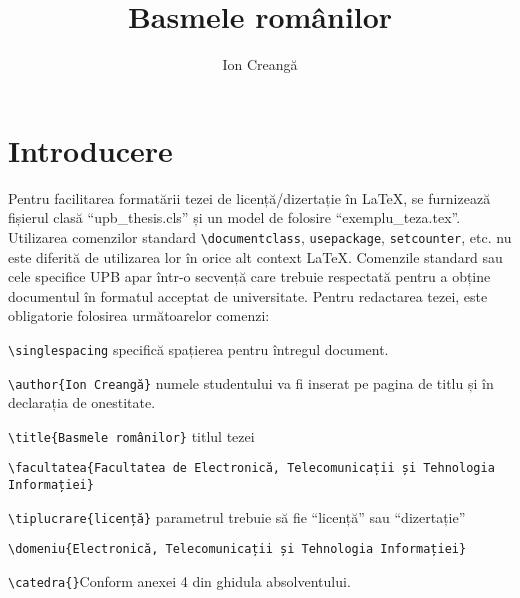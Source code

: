 \documentclass[12pt, a4paper, oneside, romanian]{teza-upb}
\begin{document}
\author{Ion Creangă}

\title{Basmele românilor}




\beforepreface
\listoffigures
\listoftables
{}
\afterpreface 

\chapter{Introducere}


   Pentru facilitarea formatării tezei de licență/dizertație în
   \LaTeX{}, se furnizează fișierul clasă ``upb\_thesis.cls'' și un model de
   folosire ``exemplu\_teza.tex''.  Utilizarea comenzilor standard
   \verb=\documentclass=, \verb=usepackage=, \verb=setcounter=,
   etc. nu este diferită de utilizarea lor în orice alt context
   \LaTeX{}. Comenzile standard sau cele specifice {UPB}
   apar într-o secvență care trebuie respectată pentru a obține documentul în formatul
   acceptat de universitate.  Pentru redactarea tezei, este
   obligatorie folosirea următoarelor comenzi:

\verb=\singlespacing= specifică spațierea pentru întregul document.

\verb=\author{Ion Creangă}= numele studentului va fi inserat pe pagina de titlu și în declarația de onestitate.  

\verb=\title{Basmele românilor}= titlul tezei 

\verb=\facultatea{Facultatea de Electronică, Telecomunicații și Tehnologia= \\
\verb=Informației}=

\verb=\tiplucrare{licență}= parametrul trebuie să fie ``licență'' sau ``dizertație''

\verb=\domeniu{Electronică, Telecomunicații și Tehnologia Informației}=

\verb=\catedra{}=Conform anexei 4 din ghidula absolventului. 
\end{document}
